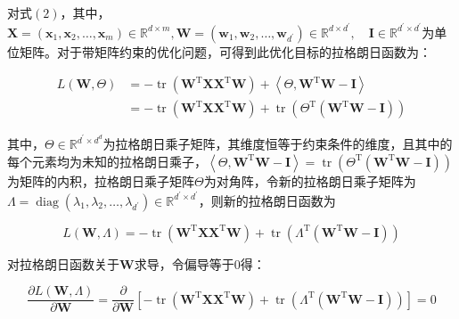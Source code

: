 \documentclass[UTF8]{ctexart}
\numberwithin{equation}{section}
\begin{document}
	对式$(2)$，其中，$\mathbf{X}=\left(\boldsymbol{x}_{1}, \boldsymbol{x}_{2}, \ldots, \boldsymbol{x}_{m}\right) \in \mathbb{R}^{d \times m}, \mathbf{W}=\left(\boldsymbol{w}_{1}, \boldsymbol{w}_{2}, \ldots, \boldsymbol{w}_{d^{\prime}}\right) \in \mathbb{R}^{d \times d^{\prime}}, \quad \mathbf{I} \in \mathbb{R}^{d^{\prime} \times d^{\prime}}$为单位矩阵。对于带矩阵约束的优化问题，可得到此优化目标的拉格朗日函数为：
	
	\begin{equation}
	\begin{aligned} L(\mathbf{W}, \Theta) &=-\operatorname{tr}\left(\mathbf{W}^{\mathrm{T}} \mathbf{X} \mathbf{X}^{\mathrm{T}} \mathbf{W}\right)+\left\langle\Theta, \mathbf{W}^{\mathrm{T}} \mathbf{W}-\mathbf{I}\right\rangle \\ &=-\operatorname{tr}\left(\mathbf{W}^{\mathrm{T}} \mathbf{X} \mathbf{X}^{\mathrm{T}} \mathbf{W}\right)+\operatorname{tr}\left(\Theta^{\mathrm{T}}\left(\mathbf{W}^{\mathrm{T}} \mathbf{W}-\mathbf{I}\right)\right) \end{aligned}\tag{3}
	\end{equation}
	
	其中，$\Theta \in \mathbb{R}^{d^{\prime} \times d^{d}}$为拉格朗日乘子矩阵，其维度恒等于约束条件的维度，且其中的每个元素均为未知的拉格朗日乘子，$\left\langle\Theta, \mathbf{W}^{\mathrm{T}} \mathbf{W}-\mathbf{I}\right\rangle=\operatorname{tr}\left(\Theta^{\mathrm{T}}\left(\mathbf{W}^{\mathrm{T}} \mathbf{W}-\mathbf{I}\right)\right)$为矩阵的内积，拉格朗日乘子矩阵$\Theta$为对角阵，令新的拉格朗日乘子矩阵为$\Lambda=\operatorname{diag}\left(\lambda_{1}, \lambda_{2}, \ldots, \lambda_{d^{\prime}}\right) \in \mathbb{R}^{d^{\prime} \times d^{\prime}}$，则新的拉格朗日函数为
	
	\begin{equation}
	L(\mathbf{W}, \Lambda)=-\operatorname{tr}\left(\mathbf{W}^{\mathrm{T}} \mathbf{X} \mathbf{X}^{\mathrm{T}} \mathbf{W}\right)+\operatorname{tr}\left(\Lambda^{\mathrm{T}}\left(\mathbf{W}^{\mathrm{T}} \mathbf{W}-\mathbf{I}\right)\right)\tag{4}
	\end{equation}
	
	对拉格朗日函数关于$\mathbf{W}$求导，令偏导等于$0$得：
	
	\begin{equation}
	\frac{\partial L(\mathbf{W}, \Lambda)}{\partial \mathbf{W}}=\frac{\partial}{\partial \mathbf{W}}\left[-\operatorname{tr}\left(\mathbf{W}^{\mathrm{T}} \mathbf{X} \mathbf{X}^{\mathrm{T}} \mathbf{W}\right)+\operatorname{tr}\left(\Lambda^{\mathrm{T}}\left(\mathbf{W}^{\mathrm{T}} \mathbf{W}-\mathbf{I}\right)\right)\right]=0\tag{5}
	\end{equation}
	
\end{document}
